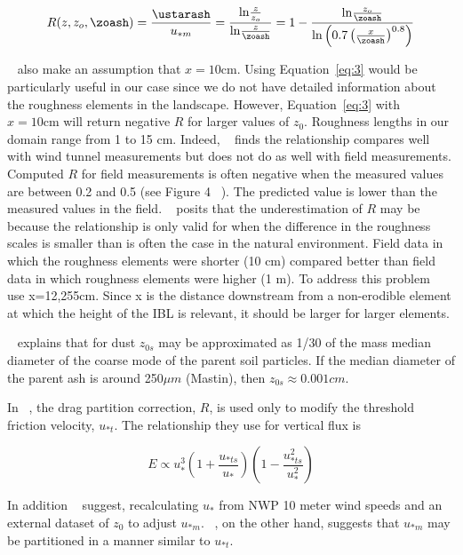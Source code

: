 \begin{equation}
R(z, z_o, \zoash) = \frac{\ustarash}{u_{*m}} = \frac{\mathrm{ln}\frac{z}{z_o}}{\mathrm{ln}\frac{z}{\zoash}} = 1 - \frac{\mathrm{ln}\frac{z_o}{\zoash}}{\mathrm{ln}\left( 0.7\left( \frac{x}{\zoash} \right)^{0.8}\right)}
\label{eq:3}
\end{equation}

~\cite{Marticorena95} also make an assumption that $x=10\mathrm{cm}$.  
Using Equation~\ref{eq:3} would be particularly useful in our case since we do not have detailed information about the roughness elements in the landscape.
However, Equation~\ref{eq:3} with $x=10\mathrm{cm}$ will return negative $R$ for  larger values of $z_0$.
Roughness lengths in our domain range from 1 to 15 cm.
Indeed, ~\cite{King05} finds the relationship compares well with wind tunnel measurements but does not do as well with field measurements. Computed
 $R$ for field measurements is often negative when the measured values are between 0.2 and 0.5 (see Figure 4 ~\cite{King05}). The predicted value  
is lower than the measured values in the field. ~\cite{King05} posits that the underestimation of $R$ may be because the relationship is only valid for when
the difference in the roughness scales is smaller than is often the case in the natural environment. Field data in which the roughness elements were shorter (10 cm) compared
better than field data in which roughness elements were higher (1 m). 
To address this problem ~\cite{MacKinnon04} use x=12,255cm. 
Since x is the distance downstream from a non-erodible element at which the height of the IBL is relevant, it should be larger for larger elements.

~\cite{Darmenova09} explains that for dust $z_{0s}$ may be approximated as 1/30 of the mass median diameter of the coarse mode of the parent soil particles.
If the median diameter of the parent ash is around 250$\mu m$ (Mastin), then $z_{0s} \approx 0.001cm$. 

In ~\cite{Darmenova09}, the drag partition correction, $R$, is used only to modify the threshold friction velocity, $u_{*t}$. The relationship 
they use for vertical flux is 

$$E \propto  u_*^{3}\left(1 + \frac{u_{*ts}}{u_*}\right) \left(1-\frac{u_{*ts}^2}{u_*^2}\right)$$

In addition ~\cite{Darmenova09} suggest, recalculating $u_*$ from NWP 10 meter wind speeds and an external dataset of $z_0$ to adjust
$u_{*m}$. ~\cite{Kok14}, on the other hand, suggests that $u_{*m}$ may be partitioned in a manner similar to $u_{*t}$.


